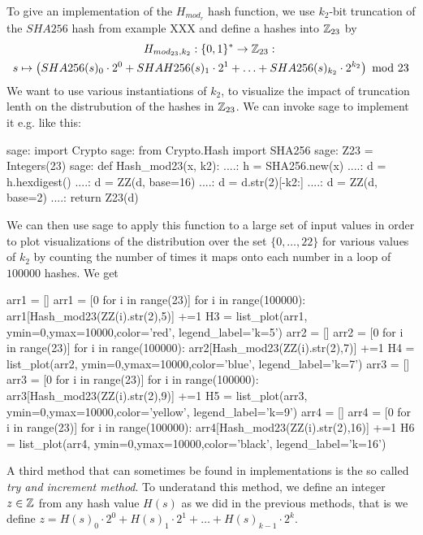 \begin{example} To give an implementation of the $H_{mod_r}$ hash function, we use  $k_2$-bit truncation of the $SHA256$ hash from example XXX and define a hashes into $\mathbb{Z}_{23}$ by
\begin{multline*}
H_{mod_{23},k_2}: \{0,1\}^* \to \mathbb{Z}_{23}:\; \\
s\mapsto
\left(SHA256(s)_0\cdot 2^0 + SHAH256(s)_1\cdot 2^1 + \ldots + SHA256(s)_{k_2}\cdot 2^{k_2}\right) \text{ mod } 23 
\end{multline*}
We want to use various instantiations of $k_2$, to visualize the impact of truncation lenth on the distrubution of the hashes in $\mathbb{Z}_{23}$. We can invoke sage to implement it e.g. like this:
\begin{sagecommandline}
sage: import Crypto 
sage: from Crypto.Hash import SHA256
sage: Z23 = Integers(23)
sage: def Hash_mod23(x, k2):
....:     h = SHA256.new(x)
....:     d = h.hexdigest()
....:     d = ZZ(d, base=16)
....:     d = d.str(2)[-k2:]
....:     d = ZZ(d, base=2)
....:     return Z23(d)
\end{sagecommandline}
We can then use sage to apply this function to a large set of input values in order to plot visualizations of the distribution over the set $\{0,\ldots,22\}$ for various values of $k_2$ by counting the number of times it maps onto each number in a loop of $100000$ hashes. We get
\begin{sagesilent}
arr1 = []
arr1 = [0 for i in range(23)]
for i in range(100000):
    arr1[Hash_mod23(ZZ(i).str(2),5)] +=1
H3 = list_plot(arr1, ymin=0,ymax=10000,color='red', legend_label='k=5')
arr2 = []
arr2 = [0 for i in range(23)]
for i in range(100000):
    arr2[Hash_mod23(ZZ(i).str(2),7)] +=1
H4 = list_plot(arr2, ymin=0,ymax=10000,color='blue', legend_label='k=7')
arr3 = []
arr3 = [0 for i in range(23)]
for i in range(100000):
    arr3[Hash_mod23(ZZ(i).str(2),9)] +=1
H5 = list_plot(arr3, ymin=0,ymax=10000,color='yellow', legend_label='k=9')
arr4 = []
arr4 = [0 for i in range(23)]
for i in range(100000):
    arr4[Hash_mod23(ZZ(i).str(2),16)] +=1
H6 = list_plot(arr4, ymin=0,ymax=10000,color='black', legend_label='k=16')
\end{sagesilent}
\begin{center} 
\end{center}
\end{example}
A third method that can sometimes be found in implementations is the so called \textit{try and increment method}. To underatand this method, we define an integer $z\in\mathbb{Z}$ from any hash value $H(s)$ as we did in the previous methods, that is we define $z = H(s)_0\cdot 2^0 + H(s)_1\cdot 2^1 + \ldots + H(s)_{k-1}\cdot 2^{k}$. 

